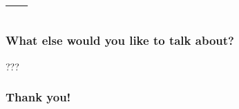 \documentclass[14pt,aspectratio=1610]{beamer} %
\newcommand{\fframe}[2]{
   \begin{frame}
\frametitle{#1}
#2
\end{frame}
}
\begin{document}
\section*{---}
\fframe{What else would you like to talk about?}
{
	???
}





%
\fframe{Thank you!}{


}
\end{document}

